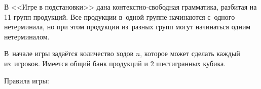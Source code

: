\documentclass{csmathnotes}
\newtheorem{definition}{Определение}
\begin{document}
%		
%		
%		
%
%

В <<Игре в подстановки>> дана контекстно-свободная грамматика, разбитая на 11 групп продукций. Все продукции в~одной группе начинаются с~одного нетерминала, но при этом продукции из~разных групп могут начинаться одним нетерминалом. 

В~начале игры задаётся количество ходов $n$, которое может сделать каждый из~игроков. Имеется общий банк продукций и 2 шестигранных кубика.

Правила игры:
\end{document}
